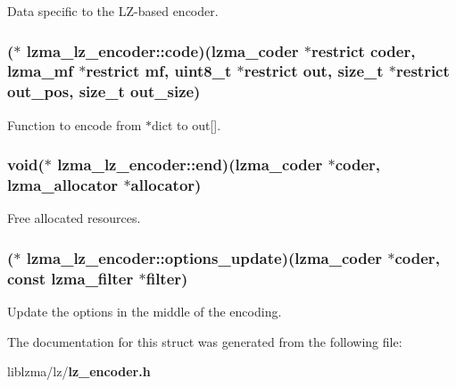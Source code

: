 Data specific to the L\-Z-\/based encoder. 

\subsubsection[{code}]{($\ast$ lzma\-\_\-lz\-\_\-encoder\-::code)({\bf lzma\-\_\-coder} $\ast$restrict {\bf coder}, {\bf lzma\-\_\-mf} $\ast$restrict mf, uint8\-\_\-t $\ast$restrict out, size\-\_\-t $\ast$restrict out\-\_\-pos, size\-\_\-t out\-\_\-size)}\label{structlzma__lz__encoder_aa3705266c2facfdb4c3eb0bf40dfe6fb}


Function to encode from $\ast$dict to out[]. 

\subsubsection[{end}]{\setlength{\rightskip}{0pt plus 5cm}void($\ast$ lzma\-\_\-lz\-\_\-encoder\-::end)({\bf lzma\-\_\-coder} $\ast${\bf coder}, {\bf lzma\-\_\-allocator} $\ast$allocator)}\label{structlzma__lz__encoder_acced3279d004c735540a45e09a3a5dbf}


Free allocated resources. 

\subsubsection[{options\-\_\-update}]{($\ast$ lzma\-\_\-lz\-\_\-encoder\-::options\-\_\-update)({\bf lzma\-\_\-coder} $\ast${\bf coder}, const {\bf lzma\-\_\-filter} $\ast$filter)}\label{structlzma__lz__encoder_a311f2c50802133828d39bf9977dde973}


Update the options in the middle of the encoding. 



The documentation for this struct was generated from the following file\-:\begin{DoxyCompactItemize}
\item 
liblzma/lz/{\bf lz\-\_\-encoder.\-h}\end{DoxyCompactItemize}
